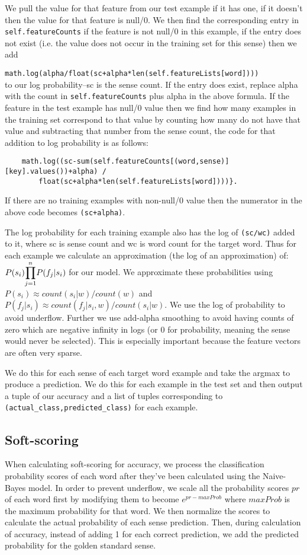 \documentclass{article}
\begin{document}
We pull the value for that feature from our test example if it has one, if it doesn't then the value for that feature is null/0. We then find the corresponding entry in \texttt{self.featureCounts} if the feature is not null/0 in this example, if the entry does not exist (i.e. the value does not occur in the training set for this sense) then we add\par
\texttt{math.log(alpha/float(sc+alpha*len(self.featureLists[word])))}\\
to our log probability--sc is the sense count. If the entry does exist, replace alpha with the count in \texttt{self.featureCounts} plus alpha in the above formula. If the feature in the test example has null/0 value then we find how many examples in the training set correspond to that value by counting how many do not have that value and subtracting that number from the sense count, the code for that addition to log probability is as follows:\par
\begin{verbatim}
    math.log((sc-sum(self.featureCounts[(word,sense)][key].values())+alpha) /
        float(sc+alpha*len(self.featureLists[word])))}.
\end{verbatim}
If there are no training examples with non-null/0 value then the numerator in the above code becomes \texttt{(sc+alpha)}.

The log probability for each training example also has the log of \texttt{(sc/wc)} added to it, where sc is sense count and wc is word count for the target word. Thus for each example we calculate an approximation (the log of an approximation) of:
$P(s_i)\mathlarger{\prod}_{j=1}^{n}P(f_j|s_i)$ for our model. We approximate these probabilities using $P(s_i) \approx count(s_i|w)/count(w)$ and $P(f_j|s_i) \approx count(f_j|s_i,w)/count(s_i|w)$. We use the log of probability to avoid underflow. Further we use add-alpha smoothing to avoid having counts of zero which are negative infinity in logs (or 0 for probability, meaning the sense would never be selected). This is especially important because the feature vectors are often very sparse.

We do this for each sense of each target word example and take the argmax to produce a prediction. We do this for each example in the test set and then output a tuple of our accuracy and a list of tuples corresponding to \texttt{(actual\_class,predicted\_class)} for each example. 

\subsection{Soft-scoring}
When calculating soft-scoring for accuracy, we process the classification probability scores of each word after they've been calculated using the Naive-Bayes model. In order to prevent underflow, we scale all the probability scores $pr$ of each word first by modifying them to become $e^{pr-maxProb}$ where $maxProb$ is the maximum probability for that word. We then normalize the scores to calculate the actual probability of each sense prediction. Then, during calculation of accuracy, instead of adding 1 for each correct prediction, we add the predicted probability for the golden standard sense.
\end{document}
